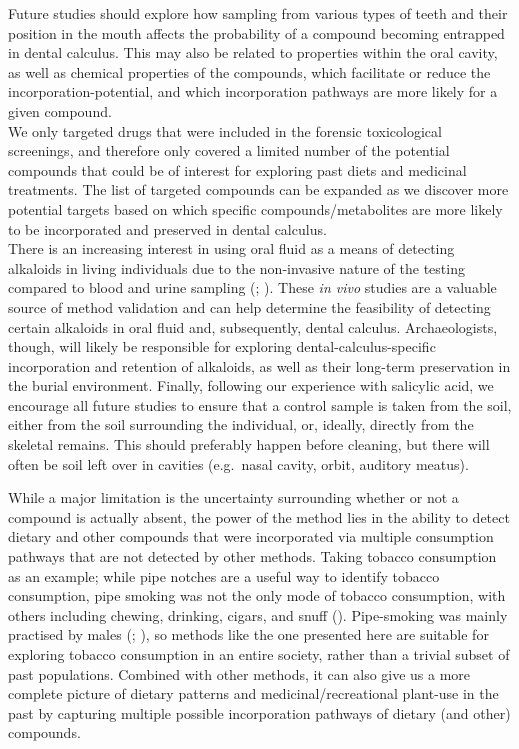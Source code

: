 \documentclass[
  11pt,
  leqno]{scrartcl}
\begin{document}
Future studies should explore how sampling from various types of teeth
and their position in the mouth affects the probability of a compound
becoming entrapped in dental calculus. This may also be related to
properties within the oral cavity, as well as chemical properties of the
compounds, which facilitate or reduce the incorporation-potential, and
which incorporation pathways are more likely for a given compound.\\
We only targeted drugs that were included in the forensic toxicological
screenings, and therefore only covered a limited number of the potential
compounds that could be of interest for exploring past diets and
medicinal treatments. The list of targeted compounds can be expanded as
we discover more potential targets based on which specific
compounds/metabolites are more likely to be incorporated and preserved
in dental calculus.\\
There is an increasing interest in using oral fluid as a means of
detecting alkaloids in living individuals due to the non-invasive nature
of the testing compared to blood and urine sampling
(;
). These
\emph{in vivo} studies are a valuable source of method validation and
can help determine the feasibility of detecting certain alkaloids in
oral fluid and, subsequently, dental calculus. Archaeologists, though,
will likely be responsible for exploring dental-calculus-specific
incorporation and retention of alkaloids, as well as their long-term
preservation in the burial environment. Finally, following our
experience with salicylic acid, we encourage all future studies to
ensure that a control sample is taken from the soil, either from the
soil surrounding the individual, or, ideally, directly from the skeletal
remains. This should preferably happen before cleaning, but there will
often be soil left over in cavities (e.g.~nasal cavity, orbit, auditory
meatus).

While a major limitation is the uncertainty surrounding whether or not a
compound is actually absent, the power of the method lies in the ability
to detect dietary and other compounds that were incorporated via
multiple consumption pathways that are not detected by other methods.
Taking tobacco consumption as an example; while pipe notches are a
useful way to identify tobacco consumption, pipe smoking was not the
only mode of tobacco consumption, with others including chewing,
drinking, cigars, and snuff
().
Pipe-smoking was mainly practised by males
(;
), so
methods like the one presented here are suitable for exploring tobacco
consumption in an entire society, rather than a trivial subset of past
populations. Combined with other methods, it can also give us a more
complete picture of dietary patterns and medicinal/recreational
plant-use in the past by capturing multiple possible incorporation
pathways of dietary (and other) compounds.
\end{document}
